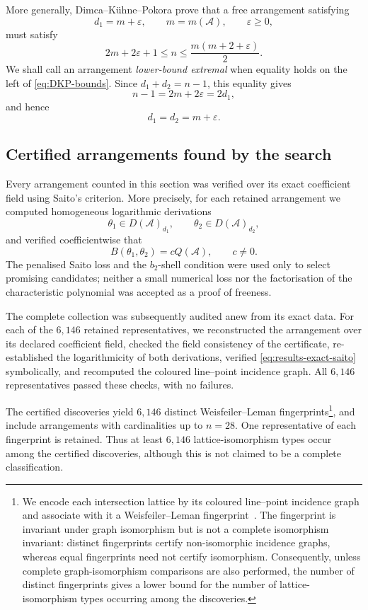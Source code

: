 \documentclass[pdflatex,sn-mathphys-num]{sn-jnl}%
\renewcommand{\epsilon}{\varepsilon}
\theoremstyle{remark}
\theoremstyle{definition}
\begin{document}
More generally, Dimca--K\"uhne--Pokora prove
\cite[Proposition~3.1]{Dimca2026freelinearrangementslow} that a free
arrangement satisfying
\[
d_1=m+\epsilon,
\qquad
m=m(\mathcal{A}),
\qquad
\epsilon\geq0,
\]
must satisfy
\begin{equation}
\label{eq:DKP-bounds}
2m+2\epsilon+1
\leq n
\leq
\frac{m(m+2+\epsilon)}{2}.
\end{equation}
We shall call an arrangement \emph{lower-bound extremal} when equality holds
on the left of \eqref{eq:DKP-bounds}. Since
$d_1+d_2=n-1$, this equality gives
\[
n-1=2m+2\epsilon=2d_1,
\]
and hence
\[
d_1=d_2=m+\epsilon.
\]

\subsection{Certified arrangements found by the search}

Every arrangement counted in this section was verified over its exact coefficient field using Saito's criterion. More precisely, for each retained arrangement we computed homogeneous logarithmic derivations
\[
\theta_1\in D(\mathcal{A})_{d_1},
\qquad
\theta_2\in D(\mathcal{A})_{d_2},
\]
and verified coefficientwise that
\begin{equation}
\label{eq:results-exact-saito}
B(\theta_1,\theta_2)
=
cQ(\mathcal{A}),
\qquad
c\neq0.
\end{equation}
The penalised Saito loss and the $b_2$-shell condition were used only to select promising candidates; neither a small numerical loss nor the factorisation of the characteristic polynomial was accepted as a proof of
freeness.

The complete collection was subsequently audited anew from its exact data. For each of the $6{,}146$ retained representatives, we reconstructed the arrangement over its declared coefficient field, checked the field consistency of the certificate, re-established the logarithmicity of both derivations, verified \eqref{eq:results-exact-saito} symbolically, and recomputed the coloured line--point incidence graph. All $6{,}146$ representatives passed these checks, with no failures.

The certified discoveries yield $6{,}146$ distinct Weisfeiler--Leman fingerprints\footnote{We encode each intersection lattice by its coloured line--point incidence graph and associate with it a Weisfeiler--Leman fingerprint~\cite{Kiefer2020}. The fingerprint is invariant under graph isomorphism but is not a complete isomorphism invariant: distinct fingerprints certify non-isomorphic incidence graphs, whereas equal fingerprints need not certify isomorphism. Consequently, unless complete graph-isomorphism comparisons are also performed, the number of distinct fingerprints gives a lower bound for the number of lattice-isomorphism types occurring among the discoveries.}, and include arrangements with cardinalities up to $n=28$. One representative of each fingerprint is retained. Thus at least $6{,}146$ lattice-isomorphism types occur among the certified discoveries, although this is not claimed to be a complete
classification.
\end{document}
